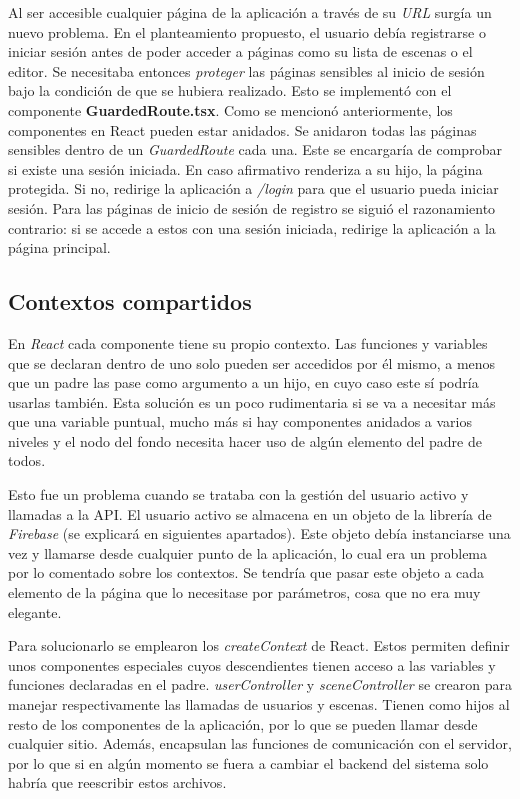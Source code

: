 Al ser accesible cualquier página de la aplicación a través de su \textit{URL} surgía un nuevo problema. En el planteamiento propuesto, el usuario debía registrarse o iniciar sesión antes de poder acceder a páginas como su lista de escenas o el editor. Se necesitaba entonces \textit{proteger} las páginas sensibles al inicio de sesión bajo la condición de que se hubiera realizado. Esto se implementó con el componente \textbf{GuardedRoute.tsx}. Como se mencionó anteriormente, los componentes en React pueden estar anidados. Se anidaron todas las páginas sensibles dentro de un \textit{GuardedRoute} cada una. Este se encargaría de comprobar si existe una sesión iniciada. En caso afirmativo renderiza a su hijo, la página protegida. Si no, redirige la aplicación a \textit{/login} para que el usuario pueda iniciar sesión. Para las páginas de inicio de sesión de registro se siguió el razonamiento contrario: si se accede a estos con una sesión iniciada, redirige la aplicación a la página principal.

\subsection{Contextos compartidos}

En \textit{React} cada componente tiene su propio contexto. Las funciones y variables que se declaran dentro de uno solo pueden ser accedidos por él mismo, a menos que un padre las pase como argumento a un hijo, en cuyo caso este sí  podría usarlas también. Esta solución es un poco rudimentaria si se va a necesitar más que una variable puntual, mucho más si hay componentes anidados a varios niveles y el nodo del fondo necesita hacer uso de algún elemento del padre de todos.

Esto fue un problema cuando se trataba con la gestión del usuario activo y llamadas a la API. El usuario activo se almacena en un objeto de la librería de \textit{Firebase} (se explicará en siguientes apartados). Este objeto debía instanciarse una vez y llamarse desde cualquier punto de la aplicación, lo cual era un problema por lo comentado sobre los contextos. Se tendría que pasar este objeto a cada elemento de la página que lo necesitase por parámetros, cosa que no era muy elegante.

Para solucionarlo se emplearon los \textit{createContext} de React. Estos permiten definir unos componentes especiales cuyos descendientes tienen acceso a las variables y funciones declaradas en el padre. \textit{userController} y \textit{sceneController} se crearon para manejar respectivamente las llamadas de usuarios y escenas. Tienen como hijos al resto de los componentes de la aplicación, por lo que se pueden llamar desde cualquier sitio. Además, encapsulan las funciones de comunicación con el servidor, por lo que si en algún momento se fuera a cambiar el backend del sistema solo habría que reescribir estos archivos.

